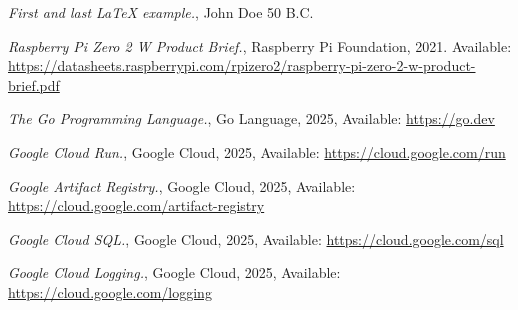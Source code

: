 \begin{thebibliography}{9}

   \emph{First and last \LaTeX{} example.},
  John Doe 50 B.C. 

   \emph{Raspberry Pi Zero 2 W Product Brief.},
  Raspberry Pi Foundation, 2021. Available: \url{https://datasheets.raspberrypi.com/rpizero2/raspberry-pi-zero-2-w-product-brief.pdf}

   \emph{The Go Programming Language.},
  Go Language, 2025, Available: \url{https://go.dev}

   \emph{Google Cloud Run.},
  Google Cloud, 2025, Available: \url{https://cloud.google.com/run}

   \emph{Google Artifact Registry.},
  Google Cloud, 2025, Available: \url{https://cloud.google.com/artifact-registry}

   \emph{Google Cloud SQL.},
  Google Cloud, 2025, Available: \url{https://cloud.google.com/sql}

   \emph{Google Cloud Logging.},
  Google Cloud, 2025, Available: \url{https://cloud.google.com/logging}
  
\end{thebibliography}